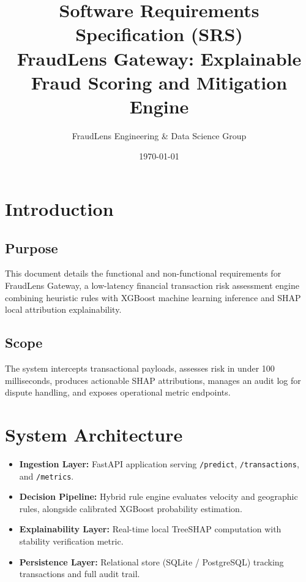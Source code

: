 \documentclass[11pt,a4paper]{article}
\title{\textbf{Software Requirements Specification (SRS)\\FraudLens Gateway: Explainable Fraud Scoring and Mitigation Engine}}
\author{FraudLens Engineering \& Data Science Group}
\date{\today}
\begin{document}
\maketitle

\section{Introduction}
\subsection{Purpose}
This document details the functional and non-functional requirements for FraudLens Gateway, a low-latency financial transaction risk assessment engine combining heuristic rules with XGBoost machine learning inference and SHAP local attribution explainability.

\subsection{Scope}
The system intercepts transactional payloads, assesses risk in under 100 milliseconds, produces actionable SHAP attributions, manages an audit log for dispute handling, and exposes operational metric endpoints.

\section{System Architecture}
\begin{itemize}
    \item \textbf{Ingestion Layer:} FastAPI application serving \texttt{/predict}, \texttt{/transactions}, and \texttt{/metrics}.
    \item \textbf{Decision Pipeline:} Hybrid rule engine evaluates velocity and geographic rules, alongside calibrated XGBoost probability estimation.
    \item \textbf{Explainability Layer:} Real-time local TreeSHAP computation with stability verification metric.
    \item \textbf{Persistence Layer:} Relational store (SQLite / PostgreSQL) tracking transactions and full audit trail.
\end{itemize}
\end{document}
